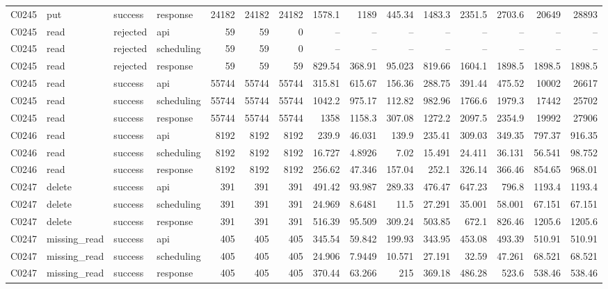 \begin{landscape}
\begin{longtable}{llllrrrrrrrrrrr}
C0245 & put & success & response & 24182 & 24182 & 24182 & 1578.1 & 1189 & 445.34 & 1483.3 & 2351.5 & 2703.6 & 20649 & 28893\\
C0245 & read & rejected & api & 59 & 59 & 0 & -- & -- & -- & -- & -- & -- & -- & --\\
C0245 & read & rejected & scheduling & 59 & 59 & 0 & -- & -- & -- & -- & -- & -- & -- & --\\
C0245 & read & rejected & response & 59 & 59 & 59 & 829.54 & 368.91 & 95.023 & 819.66 & 1604.1 & 1898.5 & 1898.5 & 1898.5\\
C0245 & read & success & api & 55744 & 55744 & 55744 & 315.81 & 615.67 & 156.36 & 288.75 & 391.44 & 475.52 & 10002 & 26617\\
C0245 & read & success & scheduling & 55744 & 55744 & 55744 & 1042.2 & 975.17 & 112.82 & 982.96 & 1766.6 & 1979.3 & 17442 & 25702\\
C0245 & read & success & response & 55744 & 55744 & 55744 & 1358 & 1158.3 & 307.08 & 1272.2 & 2097.5 & 2354.9 & 19992 & 27906\\
C0246 & read & success & api & 8192 & 8192 & 8192 & 239.9 & 46.031 & 139.9 & 235.41 & 309.03 & 349.35 & 797.37 & 916.35\\
C0246 & read & success & scheduling & 8192 & 8192 & 8192 & 16.727 & 4.8926 & 7.02 & 15.491 & 24.411 & 36.131 & 56.541 & 98.752\\
C0246 & read & success & response & 8192 & 8192 & 8192 & 256.62 & 47.346 & 157.04 & 252.1 & 326.14 & 366.46 & 854.65 & 968.01\\
C0247 & delete & success & api & 391 & 391 & 391 & 491.42 & 93.987 & 289.33 & 476.47 & 647.23 & 796.8 & 1193.4 & 1193.4\\
C0247 & delete & success & scheduling & 391 & 391 & 391 & 24.969 & 8.6481 & 11.5 & 27.291 & 35.001 & 58.001 & 67.151 & 67.151\\
C0247 & delete & success & response & 391 & 391 & 391 & 516.39 & 95.509 & 309.24 & 503.85 & 672.1 & 826.46 & 1205.6 & 1205.6\\
C0247 & missing\_\allowbreak{}read & success & api & 405 & 405 & 405 & 345.54 & 59.842 & 199.93 & 343.95 & 453.08 & 493.39 & 510.91 & 510.91\\
C0247 & missing\_\allowbreak{}read & success & scheduling & 405 & 405 & 405 & 24.906 & 7.9449 & 10.571 & 27.191 & 32.59 & 47.261 & 68.521 & 68.521\\
C0247 & missing\_\allowbreak{}read & success & response & 405 & 405 & 405 & 370.44 & 63.266 & 215 & 369.18 & 486.28 & 523.6 & 538.46 & 538.46\\

\end{longtable}
\end{landscape}
